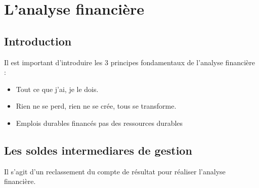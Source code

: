 \documentclass[12pt,oneside,a4paper]{article}
\begin{document}

 
 \newpage
{\hypersetup{linkcolor=black} \tableofcontents}


\newpage


\section{L'analyse financière} %
\label{sec:l_analyse_financiere}


\subsection{Introduction} %
\label{sub:introduction}

Il est important d'introduire les 3 principes fondamentaux de l'analyse financière :

\begin{itemize}[label=]

	\item Tout ce que j'ai, je le dois.

	\item Rien ne se perd, rien ne se crée, tous se transforme.

	\item Emplois durables financés pas des ressources durables

\end{itemize}


\subsection{Les soldes intermediares de gestion} %
\label{sub:les_soldes_intermediares_de_gestion}

Il s'agit d'un reclassement du compte de résultat pour réaliser l'analyse financière.

\vfill
\end{document}
